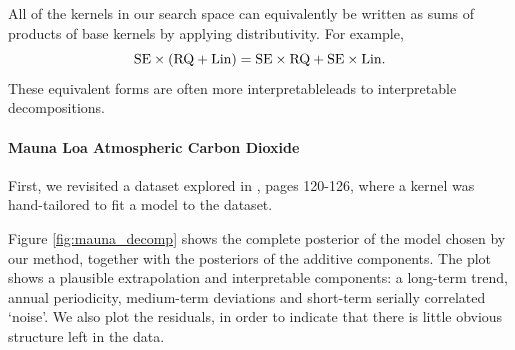 \documentclass[twoside]{article}
\begin{document}
All of the kernels in our search space can equivalently be written as sums of products of base kernels by applying distributivity. For example,
\[{\textrm{SE} \times (\textrm{RQ} + \textrm{Lin}) = \textrm{SE} \times \textrm{RQ} + \textrm{SE} \times \textrm{Lin}}.\]
These equivalent forms are often more interpretableleads to interpretable decompositions.%



\label{sec:extrapolation}
\paragraph{Mauna Loa Atmospheric Carbon Dioxide}

First, we revisited a dataset explored in \cite{rasmussen38gaussian}, pages 120-126, where a kernel was hand-tailored to fit a \gp{} model to the dataset.


Figure \ref{fig:mauna_decomp} shows the complete posterior of the model chosen by our method, together with the posteriors of the additive components.
The plot shows a plausible extrapolation and interpretable components: a long-term trend, annual periodicity, medium-term deviations and short-term serially correlated `noise'.  We also plot the residuals, in order to indicate that there is little obvious structure left in the data.
\end{document}
